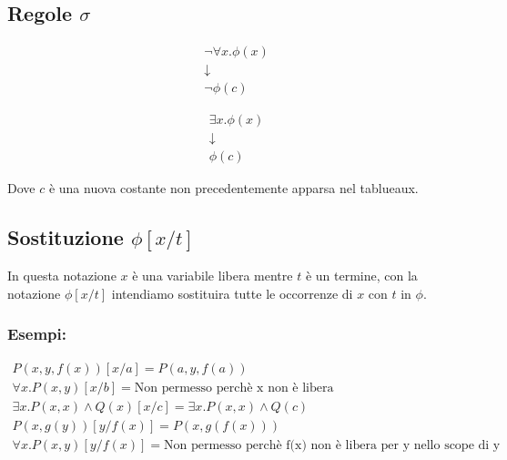 \documentclass[../main.tex]{subfiles}
\begin{document}
   \subsection{Regole $\sigma$}
   \begin{minipage}{0.5\textwidth}
      \begin{gather*}
         \lnot \forall x. \phi (x)\\
         \downarrow\\
         \lnot \phi (c)
      \end{gather*}
   \end{minipage}
   \begin{minipage}{0.5\textwidth}
      \begin{gather*}
         \exists x. \phi (x)\\
         \downarrow\\
         \phi (c)
      \end{gather*}
   \end{minipage}
   Dove $c$ è una nuova costante non precedentemente apparsa nel tablueaux.
   \subsection{Sostituzione $\phi [x/t]$}
   In questa notazione $x$ è una variabile libera mentre $t$ è un termine, con la notazione $\phi [x/t]$ intendiamo sostituira tutte le occorrenze di $x$ con $t$ in $\phi$.
   \subsubsection{Esempi:}
   \begin{gather*}
      P(x, y, f(x))[x/a] = P(a, y, f (a))\\
       \forall x.P(x, y)[x/b] = \text{Non permesso perchè x non è libera}\\
       \exists x.P(x, x)  \land Q(x)[x/c] =  \exists x.P(x, x)  \land Q(c)\\
      P(x, g(y))[y/f (x)] = P(x, g(f (x)))\\
       \forall x.P(x, y)[y/f (x)] = \text{Non permesso perchè f(x) non è libera per y nello scope di y}
   \end{gather*}
\end{document}
